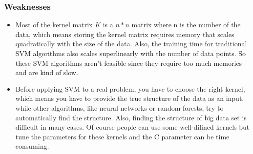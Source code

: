\documentclass{article}
\theoremstyle{definition}
\numberwithin{equation}{section}
\numberwithin{figure}{section}
\begin{document}
 \subsubsection{Weaknesses}
 \begin{itemize}
 \item Most of the kernel matrix $K$ is a $n*n$ matrix where n is the number of the data, which means storing the kernel matrix requires memory that scales quadratically with the size of the data. Also, the training time for traditional SVM algorithms also scales superlinearly with the number of data points. So these SVM algorithms aren't feasible since they require too much memories and are kind of slow.

\item Before applying SVM to a real problem, you have to choose the right kernel, which means you have to provide the true structure of the data as an input, while other algorithms, like neural networks or random-forests, try to automatically find the structure. Also, finding the structure of big data set is difficult in many cases. Of course people can use some well-difined kernels but tune the parameters for these kernels and the C parameter can be time consuming.
 \end{itemize}
\end{document}
